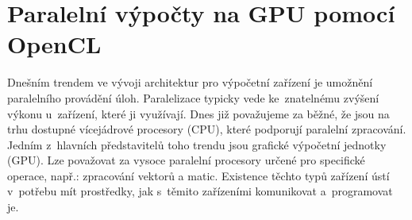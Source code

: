 %

\chapter{Paralelní výpočty na GPU pomocí OpenCL}
\label{ch:opencl}
Dnešním trendem ve vývoji architektur pro výpočetní zařízení je umožnění paralelního provádění
úloh. Paralelizace typicky vede ke~znatelnému zvýšení výkonu u~zařízení, které ji využívají. Dnes již
považujeme za běžné, že jsou na trhu dostupné vícejádrové procesory (CPU), které podporují paralelní
zpracování. Jedním z~hlavních představitelů toho trendu jsou grafické výpočetní jednotky (GPU). Lze
považovat za vysoce paralelní procesory určené pro specifické operace, např.: zpracování vektorů a
matic. Existence těchto typů zařízení ústí v~potřebu mít prostředky, jak s~těmito zařízeními
komunikovat a~programovat je.

